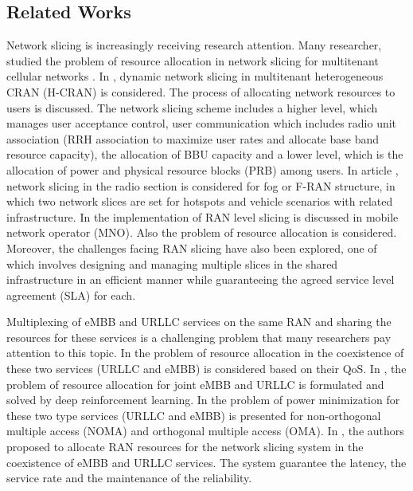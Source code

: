 \documentclass[conference]{IEEEtran}
\begin{document}
\subsection{Related Works}
Network slicing is increasingly receiving research attention.
Many researcher, studied the problem of resource allocation in network slicing for multitenant cellular networks \cite{feng2020dynamic,lee2018dynamic,lee2016new}.
In \cite{lee2018dynamic},
dynamic network slicing in multitenant heterogeneous CRAN (H-CRAN) is considered. The process of allocating network resources to users is discussed. The network slicing scheme includes a higher level, which manages user acceptance control, user communication which includes radio unit association (RRH association to maximize user rates and allocate base band resource capacity), the allocation of BBU capacity and a lower level, which is the allocation of power and physical resource blocks (PRB) among users. 
In article \cite{xiang2020realization}, network slicing in the radio section is considered for fog or F-RAN structure, in which two network slices are set for hotspots and vehicle scenarios with related infrastructure. In \cite{elayoubi20195g,d2020toward} the implementation of RAN level slicing is discussed in mobile network operator (MNO). Also the problem of resource allocation is considered. 
Moreover, the challenges facing RAN slicing have also been explored, one of which involves designing and managing multiple slices in the shared infrastructure in an efficient manner while guaranteeing the agreed 
service level agreement (SLA) for each.

Multiplexing of eMBB and URLLC services on the same RAN and sharing the resources for these services is a challenging problem that many researchers pay attention to this topic. In \cite{setayesh2020joint,yang2020should}
the problem of resource allocation in the coexistence of these two services (URLLC and eMBB) is considered
based on their QoS. In \cite{alsenwi2021intelligent}, the problem of resource allocation for joint eMBB and URLLC is formulated and solved by deep reinforcement learning. In \cite{saggese2021power}
the problem of power minimization for these two type services (URLLC and eMBB) is presented for non-orthogonal multiple access (NOMA) and orthogonal multiple access (OMA). In \cite{korrai2020ran},
the authors proposed to allocate RAN resources for the network slicing system in the coexistence of eMBB and URLLC services. The system guarantee the latency, the service rate and the  maintenance of the reliability.
\end{document}
